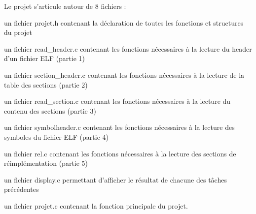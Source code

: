 \documentclass[12pt, a4paper]{article}
\begin{document}
Le projet s'articule autour de 8 fichiers : 

un fichier projet.h contenant la déclaration de toutes les fonctions et structures du projet

un fichier read_header.c contenant les fonctions nécessaires à la lecture du header d'un fichier ELF (partie 1)

un fichier section_header.c contenant les fonctions nécessaires à la lecture de la table des sections (partie 2)

un fichier read_section.c contenant les fonctions nécessaires à la lecture du contenu des sections (partie 3)

un fichier symbolheader.c contenant les fonctions nécessaires à la lecture des symboles du fichier ELF (partie 4)

un fichier rel.c contenant les fonctions nécessaires à la lecture des sections de réimplémentation (partie 5)

un fichier display.c permettant d'afficher le résultat de chacune des tâches précédentes

un fichier projet.c contenant la fonction principale du projet.
\end{document}
